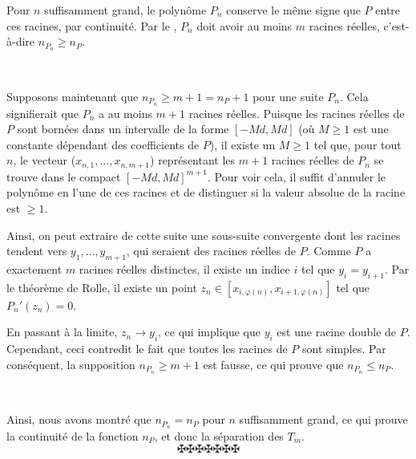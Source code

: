 Pour $n$ suffisamment grand, le polyn{\^o}me $P_n$ conserve le m{\^e}me signe
que $P$ entre ces racines, par continuit{\'e}. Par le
, $P_n$ doit
avoir au moins $m$ racines r{\'e}elles, c'est-{\`a}-dire $n_{P_n} \geq n_P$.

\


Supposons maintenant que $n_{P_n} \geq m + 1 = n_P + 1$ pour une suite $P_n$.
Cela signifierait que $P_n$ a au moins $m + 1$ racines r{\'e}elles. Puisque
les racines r{\'e}elles de $P$ sont born{\'e}es dans un intervalle de la forme
$[- Md, Md]$ (o{\`u} $M \geq 1$ est une constante d{\'e}pendant des
coefficients de $P$), il existe un $M \geq 1$ tel que, pour tout $n$, le
vecteur ($x_{n, 1}, \ldots, x_{n, m + 1}$) repr{\'e}sentant les $m + 1$
racines r{\'e}elles de $P_n$ se trouve dans le compact $[- Md, Md]^{m + 1}$.
Pour voir cela, il suffit d'annuler le polyn{\^o}me en l'une de ces racines et
de distinguer si la valeur absolue de la racine est $\geq 1$.

Ainsi, on peut extraire de cette suite une sous-suite convergente dont les
racines tendent vers $y_1, \ldots, y_{m + 1}$, qui seraient des racines
r{\'e}elles de $P$. Comme $P$ a exactement $m$ racines r{\'e}elles distinctes,
il existe un indice $i$ tel que $y_i = y_{i + 1}$. Par le th{\'e}or{\`e}me de
Rolle, il existe un point $z_n \in [x_{i, \varphi (n)}, x_{i + 1, \varphi
(n)}]$ tel que $P_n' (z_n) = 0$.

En passant {\`a} la limite, $z_n \to y_i$, ce qui implique que $y_i$ est une
racine double de $P$. Cependant, ceci contredit le fait que toutes les racines
de $P$ sont simples. Par cons{\'e}quent, la supposition $n_{P_n} \geq m + 1$
est fausse, ce qui prouve que $n_{P_n} \leq n_P$.

\

Ainsi, nous avons montr{\'e} que $n_{P_n} = n_P$ pour $n$ suffisamment grand,
ce qui prouve la continuit{\'e} de la fonction $n_P$, et donc la
s{\'e}paration des $T_m$.
\[ \maltese \maltese \maltese \maltese \maltese \maltese \maltese \]
